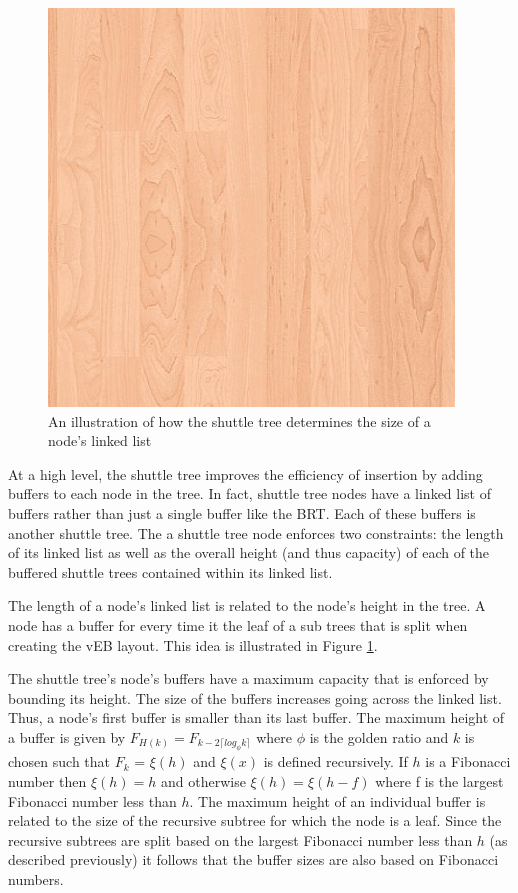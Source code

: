 \documentclass{style}
\begin{document}
\begin{figure}

\begin{center}
	\includegraphics[width=0.8\columnwidth]{figures/veb.png}
\end{center}

\caption{An illustration of how the shuttle tree determines the size of a node's linked list}
\label{fig:buffers}
\end{figure}


At a high level, the shuttle tree improves the efficiency of insertion by
adding buffers to each node in the tree. In fact, shuttle tree nodes have a
linked list of buffers rather than just a single buffer like the BRT. Each of
these buffers is another shuttle tree. The a shuttle tree node enforces two
constraints: the length of its linked list as well as the overall height (and
thus capacity) of each of the buffered shuttle trees contained within its
linked list.

The length of a node's linked list is related to the node's height in the
tree. A node has a buffer for every time it the leaf of a sub trees that is
split when creating the vEB layout. This idea is illustrated in Figure
\ref{fig:buffers}.

The shuttle tree's node's buffers have a maximum capacity that is enforced by
bounding its height. The size of the buffers increases going across the linked
list. Thus, a node's first buffer is smaller than its last buffer. The maximum
height of a buffer is given by $F_{H(k)} = F_{k-2 \lceil log_{\phi} k \rceil}
$ where $\phi$ is the golden ratio and $k$ is chosen such that $F_k$ =
$\xi(h)$ and $\xi(x)$ is defined recursively. If $h$ is a Fibonacci number
then $\xi(h) = h$ and otherwise $\xi(h) = \xi(h-f)$ where f is the largest
Fibonacci number less than $h$. The maximum height of an individual buffer is
related to the size of the recursive subtree for which the node is a leaf.
Since the recursive subtrees are split based on the largest Fibonacci number
less than $h$ (as described previously) it follows that the buffer sizes are
also based on Fibonacci numbers.
\end{document}
